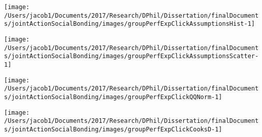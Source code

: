 \documentclass[english]{article}\usepackage[]{graphicx}\usepackage[]{color}
\makeatletter
\def\maxwidth{ %
  \ifdim\Gin@nat@width>\linewidth
    \linewidth
  \else
    \Gin@nat@width
  \fi
}
\newenvironment{kframe}{%
 \def\at@end@of@kframe{}%
 \ifinner\ifhmode%
  \def\at@end@of@kframe{\end{minipage}}%
  \begin{minipage}{\columnwidth}%
 \fi\fi%
 \def\FrameCommand##1{\hskip\@totalleftmargin \hskip-\fboxsep
 \colorbox{shadecolor}{##1}\hskip-\fboxsep
     \hskip-\linewidth \hskip-\@totalleftmargin \hskip\columnwidth}%
 \MakeFramed {\advance\hsize-\width
   \@totalleftmargin\z@ \linewidth\hsize
   \@setminipage}}%
 {\par\unskip\endMakeFramed%
 \at@end@of@kframe}
\newenvironment{knitrout}{}{} %
\makeatother
\begin{document}
\begin{knitrout}
\color{fgcolor}\begin{kframe}


{\ttfamily\noindent\bfseries{}}\end{kframe}
\end{knitrout}





\begin{knitrout}
\color{fgcolor}

{\centering \texttt{[image: /Users/jacob1/Documents/2017/Research/DPhil/Dissertation/finalDocuments/jointActionSocialBonding/images/groupPerfExpClickAssumptionsHist-1]} 

}



\end{knitrout}
\begin{knitrout}
\color{fgcolor}

{\centering \texttt{[image: /Users/jacob1/Documents/2017/Research/DPhil/Dissertation/finalDocuments/jointActionSocialBonding/images/groupPerfExpClickAssumptionsScatter-1]} 

}



\end{knitrout}
\begin{knitrout}
\color{fgcolor}

{\centering \texttt{[image: /Users/jacob1/Documents/2017/Research/DPhil/Dissertation/finalDocuments/jointActionSocialBonding/images/groupPerfExpClickQQNorm-1]} 

}



\end{knitrout}
\begin{knitrout}
\color{fgcolor}

{\centering \texttt{[image: /Users/jacob1/Documents/2017/Research/DPhil/Dissertation/finalDocuments/jointActionSocialBonding/images/groupPerfExpClickCooksD-1]} 

}



\end{knitrout}
\end{document}

